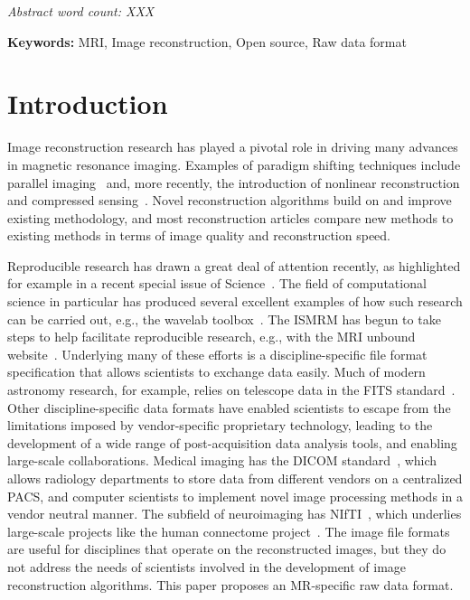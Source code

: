 \documentclass[12pt]{article}
\begin{document}
\textit{Abstract word count: XXX} %

\textbf{Keywords:}  MRI, Image reconstruction, Open source, Raw data format

\newpage
\clearpage
\onecolumn

\section*{Introduction}
Image reconstruction research has played a pivotal role in driving many advances in magnetic resonance imaging. Examples of paradigm shifting techniques include parallel imaging~\cite{Pruessmann:1999uq, Sodickson:1997fk, Griswold:2002kx}  and, more recently, the introduction of nonlinear reconstruction and compressed sensing~\cite{Donoho:2006compressed, Lustig:2007vn}. Novel reconstruction algorithms build on and improve existing methodology, and most reconstruction articles compare new methods to existing methods in terms of image quality and reconstruction speed.

Reproducible research has drawn a great deal of attention recently, as highlighted for example in a recent special issue of Science~\cite{Jasny:2011again, Peng:2011reproducible}. The field of computational science in particular has produced several excellent examples of how such research can be carried out, e.g., the wavelab toolbox~\cite{wavelab}.  The ISMRM has begun to take steps to help facilitate reproducible research, e.g., with the MRI unbound website~\cite{mri_unbound}. Underlying many of these efforts is a discipline-specific file format specification that allows scientists to exchange data easily.  Much of modern astronomy research, for example, relies on telescope data in the FITS standard~\cite{fits}.  Other discipline-specific data formats have enabled scientists to escape from the limitations imposed by vendor-specific proprietary technology, leading to the development of a wide range of post-acquisition data analysis tools, and enabling large-scale collaborations.  Medical imaging has the DICOM standard~\cite{dicom}, which allows radiology departments to store data from different vendors on a centralized PACS, and computer scientists to implement novel image processing methods in a vendor neutral manner. The subfield of neuroimaging has NIfTI~\cite{nifti}, which underlies large-scale projects like the human connectome project~\cite{connectome}. The image file formats are useful for disciplines that operate on the reconstructed images, but they do not address the needs of scientists involved in the development of image reconstruction algorithms. This paper proposes an MR-specific raw data format. 
\end{document}
